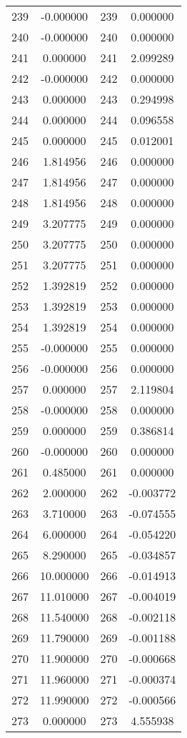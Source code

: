 \documentclass[12pt]{article}
\begin{document}
\begin{longtable}{@{}cccc@{}}
239 & -0.000000 & 239 & 0.000000 \\
240 & -0.000000 & 240 & 0.000000 \\
241 & 0.000000 & 241 & 2.099289 \\
242 & -0.000000 & 242 & 0.000000 \\
243 & 0.000000 & 243 & 0.294998 \\
244 & 0.000000 & 244 & 0.096558 \\
245 & 0.000000 & 245 & 0.012001 \\
246 & 1.814956 & 246 & 0.000000 \\
247 & 1.814956 & 247 & 0.000000 \\
248 & 1.814956 & 248 & 0.000000 \\
249 & 3.207775 & 249 & 0.000000 \\
250 & 3.207775 & 250 & 0.000000 \\
251 & 3.207775 & 251 & 0.000000 \\
252 & 1.392819 & 252 & 0.000000 \\
253 & 1.392819 & 253 & 0.000000 \\
254 & 1.392819 & 254 & 0.000000 \\
255 & -0.000000 & 255 & 0.000000 \\
256 & -0.000000 & 256 & 0.000000 \\
257 & 0.000000 & 257 & 2.119804 \\
258 & -0.000000 & 258 & 0.000000 \\
259 & 0.000000 & 259 & 0.386814 \\
260 & -0.000000 & 260 & 0.000000 \\
261 & 0.485000 & 261 & 0.000000 \\
262 & 2.000000 & 262 & -0.003772 \\
263 & 3.710000 & 263 & -0.074555 \\
264 & 6.000000 & 264 & -0.054220 \\
265 & 8.290000 & 265 & -0.034857 \\
266 & 10.000000 & 266 & -0.014913 \\
267 & 11.010000 & 267 & -0.004019 \\
268 & 11.540000 & 268 & -0.002118 \\
269 & 11.790000 & 269 & -0.001188 \\
270 & 11.900000 & 270 & -0.000668 \\
271 & 11.960000 & 271 & -0.000374 \\
272 & 11.990000 & 272 & -0.000566 \\
273 & 0.000000 & 273 & 4.555938 \\

\end{longtable}
\end{document}
